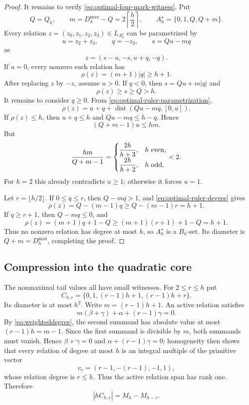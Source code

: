 \documentclass[11pt,reqno]{amsart}
\theoremstyle{definition}
\theoremstyle{remark}
\begin{document}
\begin{proof}
It remains to verify \eqref{eq:optimal-four-mark-witness}.  Put
\[
 Q=Q_h,\qquad m=D_h^{\max}-Q=2\left\lceil\frac h2\right\rceil,
 \qquad A_h^\star=\{0,1,Q,Q+m\}.
\]
Every relation $z=(z_0,z_1,z_2,z_3)\in L_{A_h^\star}$ can be
parametrized by
\[
 u=z_2+z_3,\qquad q=-z_3,\qquad s=Qu-mq
\]
as
\begin{equation}\label{eq:optimal-ruler-parametrization}
 z=(s-u,-s,u+q,-q).
\end{equation}
If $u=0$, every nonzero such relation has
\[
 \rho(z)=(m+1)|q|\geq h+1.
\]
After replacing $z$ by $-z$, assume $u>0$.  If $q<0$, then
$s=Qu+m|q|$ and
\[
 \rho(z)\geq s\geq Q>h.
\]
It remains to consider $q\geq0$.  From
\eqref{eq:optimal-ruler-parametrization},
\begin{equation}\label{eq:optimal-ruler-degree}
 \rho(z)=u+q+\operatorname{dist}(Qu-mq,[0,u]).
\end{equation}
If $\rho(z)\leq h$, then $u+q\leq h$ and
$Qu-mq\leq h-q$.  Hence
\[
 (Q+m-1)u\leq hm.
\]
But
\[
 \frac{hm}{Q+m-1}
 =
 \begin{cases}
  \dfrac{2h}{h+3},&h\ \textup{even},\\[4pt]
  \dfrac{2h}{h+2},&h\ \textup{odd},
 \end{cases}
 <2.
\]
For $h=2$ this already contradicts $u\geq1$; otherwise it forces
$u=1$.

Let $r=\lfloor h/2\rfloor$.  If $0\leq q\leq r$, then
$Q-mq>1$, and \eqref{eq:optimal-ruler-degree} gives
\[
 \rho(z)=Q-(m-1)q
 \geq Q-(m-1)r=h+1.
\]
If $q\geq r+1$, then $Q-mq\leq0$, and
\[
 \rho(z)=(m+1)q+1-Q
 \geq(m+1)(r+1)+1-Q=h+1.
\]
Thus no nonzero relation has degree at most $h$, so $A_h^\star$
is a $B_h$-set.  Its diameter is $Q+m=D_h^{\max}$, completing the proof.
\end{proof}

\subsection{Compression into the quadratic core}

The nonmaximal tail values all have small witnesses.  For $2\leq r\leq h$
put
\begin{equation}\label{eq:smallwitness}
 C_{h,r}=\{0,1,(r-1)h+1,(r-1)h+r\}.
\end{equation}
Its diameter is at most $h^2$.  Write $m=(r-1)h+1$.  An active relation
satisfies
\[
 m(\beta+\gamma)+\alpha+(r-1)\gamma=0.
\]
By \eqref{eq:weighteddegree}, the second summand has absolute value at most
$(r-1)h=m-1$.  Since the first summand is divisible by $m$, both summands
must vanish.  Hence $\beta+\gamma=0$ and
$\alpha+(r-1)\gamma=0$; homogeneity then shows that every relation of degree
at most $h$ is an integral multiple of the primitive vector
\[
 v_r=(r-1,-(r-1),-1,1),
\]
whose relation degree is $r\leq h$.  Thus the active relation span has rank
one.  Therefore
\begin{equation}\label{eq:smallwitnessvalue}
 |hC_{h,r}|=M_h-M_{h-r}.
\end{equation}
\end{document}
